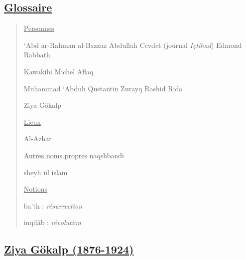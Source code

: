 \hypertarget{glossaire-3}{%
\subsection{\texorpdfstring{\underline{Glossaire}}{Glossaire}}\label{glossaire-3}}

\begin{quote}
\underline{Personnes}

`Abd ar-Rahman al-Bazzaz Abdullah Cevdet (journal \emph{Içtihad}) Edmond
Rabbath

Kawakibi Michel Aflaq

Muhammad `Abduh Qustantin Zurayq Rashid Rida

Ziya Gökalp

\underline{Lieux}

Al-Azhar

\underline{Autres noms propres} naqshbandi

sheyh ül islam

\underline{Notions}

ba'th : \emph{résurrection}

inqilâb : \emph{révolution}
\end{quote}

\hypertarget{ziya-guxf6kalp-1876-1924}{%
\subsection{\texorpdfstring{\underline{Ziya Gökalp
(1876-1924)}}{Ziya Gökalp (1876-1924)}}\label{ziya-guxf6kalp-1876-1924}}

